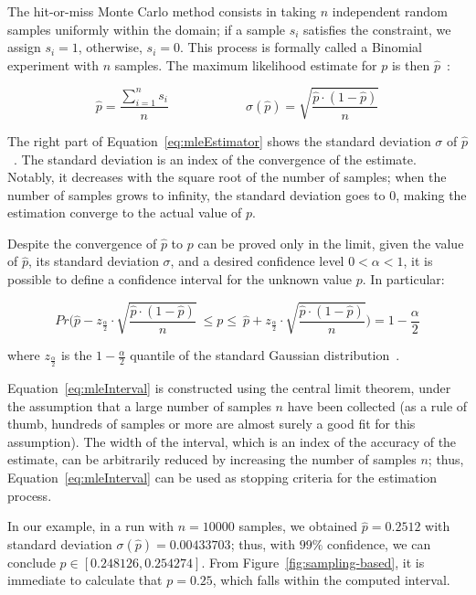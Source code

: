 The hit-or-miss Monte Carlo method consists in taking $n$ independent random samples uniformly within the domain; if a sample $s_i$ satisfies the constraint, we assign $s_i=1$, otherwise, $s_i=0$. This process is formally called a Binomial experiment with $n$ samples. The maximum likelihood estimate for $p$ is then $\hat{p}$~\cite{pestman1998mathematical}:

\begin{equation}\label{eq:mleEstimator}
	\hat{p} = \frac{\sum_{i=1}^n s_i}{n} \qquad\qquad\qquad \sigma(\hat{p}) = \sqrt{\frac{\hat{p} \cdot (1-\hat{p})}{n}}
\end{equation}
 
 
The right part of Equation~\eqref{eq:mleEstimator} shows the standard deviation $\sigma$ of $\hat{p}$~\cite{pestman1998mathematical}. The standard deviation is an index of the convergence of the estimate. Notably, it decreases with the square root of the number of samples; when the number of samples grows to infinity, the standard deviation goes to $0$, making the estimation converge to the actual value of $p$.

Despite the convergence of $\hat{p}$ to $p$ can be proved only in the limit, given the value of $\hat{p}$, its standard deviation $\sigma$, and a desired confidence level $0<\alpha<1$, it is possible to define a confidence interval for the unknown value $p$. In particular:

\begin{equation}\label{eq:mleInterval}
	Pr\Big( \hat{p} - z_{\frac{\alpha}{2}} \cdot \sqrt{\frac{\hat{p} \cdot (1-\hat{p})}{n}} \ \leq p \leq \ \hat{p} + z_{\frac{\alpha}{2}} \cdot \sqrt{\frac{\hat{p} \cdot (1-\hat{p})}{n}} \Big) = 1-\frac{\alpha}{2}
\end{equation}

\noindent where $z_{\frac{\alpha}{2}}$ is the $1-\frac{\alpha}{2}$ quantile of the standard Gaussian distribution~\cite{pestman1998mathematical}.

Equation~\eqref{eq:mleInterval} is constructed using the central limit theorem, under the assumption that a large number of samples $n$ have been collected (as a rule of thumb, hundreds of samples or more are almost surely a good fit for this assumption). The width of the interval, which is an index of the accuracy of the estimate, can be arbitrarily reduced by increasing the number of samples $n$; thus, Equation~\eqref{eq:mleInterval} can be used as stopping criteria for the estimation process.

In our example, in a run with $n=10000$ samples, we obtained $\hat{p}= 0.2512$ with standard deviation $\sigma(\hat{p})=0.00433703$; thus, with $99\%$ confidence, we can conclude $p \in [0.248126, 0.254274]$. From Figure~\ref{fig:sampling-based}, it is immediate to calculate that $p=0.25$, which falls within the computed interval.

